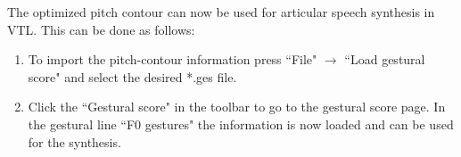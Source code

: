The optimized pitch contour can now be used for articular speech synthesis in VTL. This can be done as follows:
\begin{enumerate}
	\item To import the pitch-contour information press ``File" $\to$ ``Load gestural score" and select the desired *.ges file.
	\item Click the ``Gestural score" in the toolbar to go to the gestural score page. In the gestural line ``F0 gestures" the information is now loaded and can be used for the synthesis.
\end{enumerate}